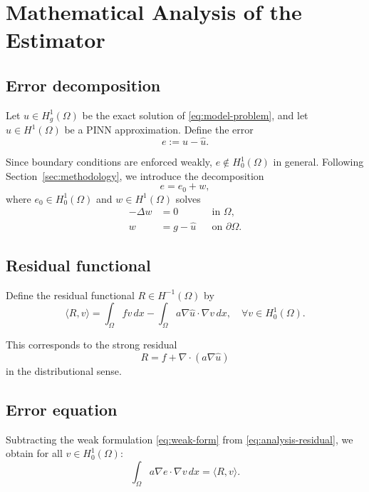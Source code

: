 \section{Mathematical Analysis of the Estimator}\label{sec:analysis}

\subsection{Error decomposition}

Let $u \in H^1_g(\Omega)$ be the exact solution of \eqref{eq:model-problem},
and let $\hat{u} \in H^1(\Omega)$ be a PINN approximation.
Define the error
\[
e := u - \hat{u}.
\]

Since boundary conditions are enforced weakly, $e \notin H^1_0(\Omega)$ in general.
Following Section~\ref{sec:methodology}, we introduce the decomposition
\begin{equation}\label{eq:analysis-decomposition}
e = e_0 + w,
\end{equation}
where $e_0 \in H^1_0(\Omega)$ and $w \in H^1(\Omega)$ solves
\begin{equation}\label{eq:analysis-lifting}
\begin{aligned}
- \Delta w &= 0 && \text{in } \Omega,\\
w &= g - \hat{u} && \text{on } \partial\Omega.
\end{aligned}
\end{equation}

\subsection{Residual functional}

Define the residual functional $R \in H^{-1}(\Omega)$ by
\begin{equation}\label{eq:analysis-residual}
\langle R, v \rangle
=
\int_\Omega f v\,dx
-
\int_\Omega a \nabla \hat{u} \cdot \nabla v\,dx,
\quad \forall v \in H^1_0(\Omega).
\end{equation}

This corresponds to the strong residual
\[
R = f + \nabla \cdot (a \nabla \hat{u})
\]
in the distributional sense.

\subsection{Error equation}

Subtracting the weak formulation \eqref{eq:weak-form} from
\eqref{eq:analysis-residual}, we obtain for all $v \in H^1_0(\Omega)$:
\begin{equation}\label{eq:error-equation}
\int_\Omega a \nabla e \cdot \nabla v \,dx
=
\langle R, v \rangle.
\end{equation}

